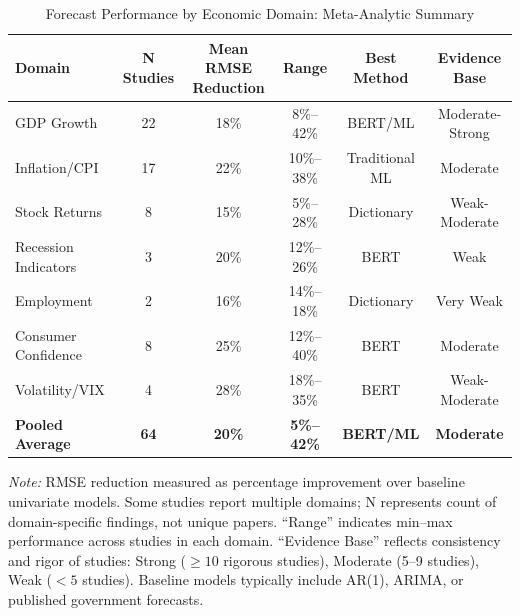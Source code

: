 \vspace{1em}


\begin{table}[h]
\centering
\caption{Forecast Performance by Economic Domain: Meta-Analytic Summary}
\label{tab:performance_domain}
\small
\begin{tabular}{|l|c|c|c|c|c|}
\hline
\textbf{Domain} & \textbf{N Studies} & \textbf{Mean RMSE Reduction} & \textbf{Range} & \textbf{Best Method} & \textbf{Evidence Base} \\
\hline
GDP Growth & 22 & 18\% & 8\%--42\% & BERT/ML & Moderate-Strong \\
\hline
Inflation/CPI & 17 & 22\% & 10\%--38\% & Traditional ML & Moderate \\
\hline
Stock Returns & 8 & 15\% & 5\%--28\% & Dictionary & Weak-Moderate \\
\hline
Recession Indicators & 3 & 20\% & 12\%--26\% & BERT & Weak \\
\hline
Employment & 2 & 16\% & 14\%--18\% & Dictionary & Very Weak \\
\hline
Consumer Confidence & 8 & 25\% & 12\%--40\% & BERT & Moderate \\
\hline
Volatility/VIX & 4 & 28\% & 18\%--35\% & BERT & Weak-Moderate \\
\hline
\textbf{Pooled Average} & \textbf{64} & \textbf{20\%} & \textbf{5\%--42\%} & \textbf{BERT/ML} & \textbf{Moderate} \\
\hline
\end{tabular}
\raggedright\footnotesize
\textit{Note:} RMSE reduction measured as percentage improvement over baseline univariate models. Some studies report multiple domains; N represents count of domain-specific findings, not unique papers. ``Range'' indicates min--max performance across studies in each domain. ``Evidence Base'' reflects consistency and rigor of studies: Strong ($\geq 10$ rigorous studies), Moderate (5--9 studies), Weak ($<5$ studies). Baseline models typically include AR(1), ARIMA, or published government forecasts.
\end{table}

\vspace{1em}


